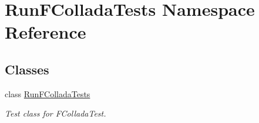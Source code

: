 \hypertarget{namespaceRunFColladaTests}{
\section{RunFColladaTests Namespace Reference}
\label{namespaceRunFColladaTests}
}
\subsection*{Classes}
\begin{DoxyCompactItemize}
\item 
class \hyperlink{classRunFColladaTests_1_1RunFColladaTests}{RunFColladaTests}
\begin{DoxyCompactList}\small\item\em Test class for FColladaTest. \item\end{DoxyCompactList}\end{DoxyCompactItemize}
